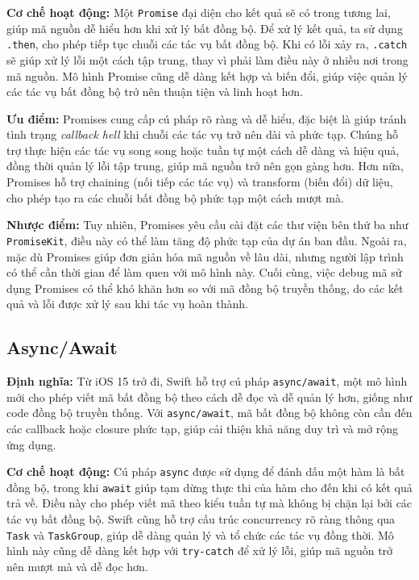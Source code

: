 \textbf{Cơ chế hoạt động:} Một \texttt{Promise} đại diện cho kết quả sẽ có trong tương lai, giúp mã nguồn dễ hiểu hơn khi xử lý bất đồng bộ. Để xử lý kết quả, ta sử dụng \texttt{.then}, cho phép tiếp tục chuỗi các tác vụ bất đồng bộ. Khi có lỗi xảy ra, \texttt{.catch} sẽ giúp xử lý lỗi một cách tập trung, thay vì phải làm điều này ở nhiều nơi trong mã nguồn. Mô hình Promise cũng dễ dàng kết hợp và biến đổi, giúp việc quản lý các tác vụ bất đồng bộ trở nên thuận tiện và linh hoạt hơn.

\textbf{Ưu điểm:} Promises cung cấp cú pháp rõ ràng và dễ hiểu, đặc biệt là giúp tránh tình trạng \textit{callback hell} khi chuỗi các tác vụ trở nên dài và phức tạp. Chúng hỗ trợ thực hiện các tác vụ song song hoặc tuần tự một cách dễ dàng và hiệu quả, đồng thời quản lý lỗi tập trung, giúp mã nguồn trở nên gọn gàng hơn. Hơn nữa, Promises hỗ trợ chaining (nối tiếp các tác vụ) và transform (biến đổi) dữ liệu, cho phép tạo ra các chuỗi bất đồng bộ phức tạp một cách mượt mà.

\textbf{Nhược điểm:} Tuy nhiên, Promises yêu cầu cài đặt các thư viện bên thứ ba như \texttt{PromiseKit}, điều này có thể làm tăng độ phức tạp của dự án ban đầu. Ngoài ra, mặc dù Promises giúp đơn giản hóa mã nguồn về lâu dài, nhưng người lập trình có thể cần thời gian để làm quen với mô hình này. Cuối cùng, việc debug mã sử dụng Promises có thể khó khăn hơn so với mã đồng bộ truyền thống, do các kết quả và lỗi được xử lý sau khi tác vụ hoàn thành.
\subsection{Async/Await}
\textbf{Định nghĩa:} Từ iOS 15 trở đi, Swift hỗ trợ cú pháp \texttt{async/await}, một mô hình mới cho phép viết mã bất đồng bộ theo cách dễ đọc và dễ quản lý hơn, giống như code đồng bộ truyền thống. Với \texttt{async/await}, mã bất đồng bộ không còn cần đến các callback hoặc closure phức tạp, giúp cải thiện khả năng duy trì và mở rộng ứng dụng.

\textbf{Cơ chế hoạt động:} Cú pháp \texttt{async} được sử dụng để đánh dấu một hàm là bất đồng bộ, trong khi \texttt{await} giúp tạm dừng thực thi của hàm cho đến khi có kết quả trả về. Điều này cho phép viết mã theo kiểu tuần tự mà không bị chặn lại bởi các tác vụ bất đồng bộ. Swift cũng hỗ trợ cấu trúc concurrency rõ ràng thông qua \texttt{Task} và \texttt{TaskGroup}, giúp dễ dàng quản lý và tổ chức các tác vụ đồng thời. Mô hình này cũng dễ dàng kết hợp với \texttt{try-catch} để xử lý lỗi, giúp mã nguồn trở nên mượt mà và dễ đọc hơn.


